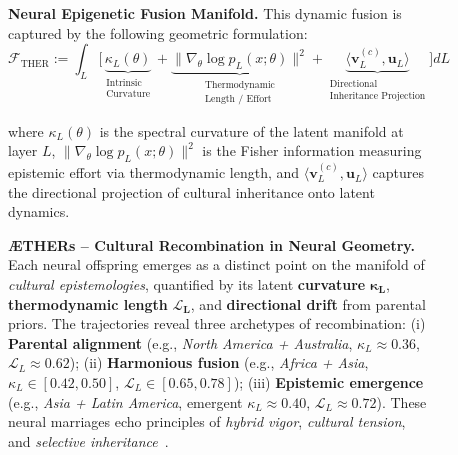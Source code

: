 \begin{figure}[ht!]
\vspace{-2mm}
\caption{
\textbf{ÆTHERs -- Cultural Recombination in Neural Geometry.}
Each neural offspring emerges as a distinct point on the manifold of \emph{cultural epistemologies}, quantified by its latent \textbf{curvature} $\boldsymbol{\kappa_L}$, \textbf{thermodynamic length} $\boldsymbol{\mathcal{L}_L}$, and \textbf{directional drift} from parental priors. The trajectories reveal three archetypes of recombination:  
(i) \textbf{Parental alignment} (e.g., \emph{North America + Australia}, $\kappa_L \approx 0.36$, $\mathcal{L}_L \approx 0.62$);  
(ii) \textbf{Harmonious fusion} (e.g., \emph{Africa + Asia}, $\kappa_L \in [0.42, 0.50]$, $\mathcal{L}_L \in [0.65, 0.78]$);  
(iii) \textbf{Epistemic emergence} (e.g., \emph{Asia + Latin America}, emergent $\kappa_L \approx 0.40$, $\mathcal{L}_L \approx 0.72$).  
These neural marriages echo principles of \emph{hybrid vigor}, \emph{cultural tension}, and \emph{selective inheritance}~\cite{durham1991coevolution, marks1995biologyculture}.
}
\label{fig:aether_fusion_page8}

\vspace{1mm}

\noindent
\textbf{Neural Epigenetic Fusion Manifold.} This dynamic fusion is captured by the following geometric formulation:
\[
\boxed{
\mathcal{F}_{\text{THER}} :=
\int_L \Big[
\underbrace{\kappa_L(\theta)}_{\substack{\text{Intrinsic}\\ \text{Curvature}}}
+
\underbrace{\|\nabla_{\theta} \log p_L(x;\theta)\|^2}_{\substack{\text{Thermodynamic}\\ \text{Length / Effort}}}
+
\underbrace{\langle \mathbf{v}_L^{(c)}, \mathbf{u}_L \rangle}_{\substack{\text{Directional}\\ \text{Inheritance Projection}}}
\Big] dL
}
\]

\vspace{-1mm}

\noindent
where $\kappa_L(\theta)$ is the spectral curvature of the latent manifold at layer $L$, $\|\nabla_{\theta} \log p_L(x;\theta)\|^2$ is the Fisher information measuring epistemic effort via thermodynamic length, and $\langle \mathbf{v}_L^{(c)}, \mathbf{u}_L \rangle$ captures the directional projection of cultural inheritance onto latent dynamics.
\end{figure}
